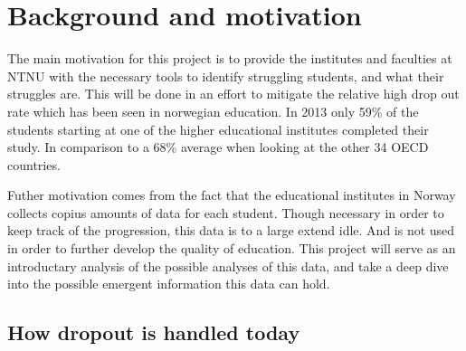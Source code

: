 \section{Background and motivation}
	The main motivation for this project is to provide the institutes and faculties at NTNU 
	with the necessary tools to identify struggling students, and what their struggles are.
	This will be done in an effort to mitigate the relative high drop out rate which has been
	seen in norwegian education. 
	In 2013 only 59\% of the students starting at one of the higher educational institutes completed their study.
	In comparison to a 68\% average when looking at the other 34 OECD countries.\cite{OECD2013}
	
	Futher motivation comes from the fact that the educational institutes in Norway collects
	copius amounts of data for each student. Though necessary in order to keep track of the progression, 
	this data is to a large extend idle. And is not used in order to further develop the quality of education. 
	This project will serve as an introductary analysis of the possible analyses of this data, 
	and take a deep dive into the possible emergent information this data can hold. 
	
\subsection{How dropout is handled today}

	